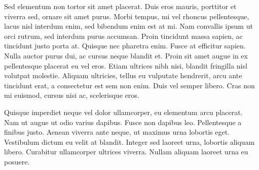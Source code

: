 Sed elementum non tortor sit amet placerat. Duis eros mauris, porttitor et viverra sed, ornare sit amet purus. Morbi tempus, mi vel rhoncus pellentesque, lacus nisl interdum enim, sed bibendum enim est at mi. Nam convallis ipsum ut orci rutrum, sed interdum purus accumsan. Proin tincidunt massa sapien, ac tincidunt justo porta at. Quisque nec pharetra enim. Fusce at efficitur sapien. Nulla auctor purus dui, ac cursus neque blandit et. Proin sit amet augue in ex pellentesque placerat eu vel eros. Etiam ultrices nibh nisi, blandit fringilla nisl volutpat molestie. Aliquam ultricies, tellus eu vulputate hendrerit, arcu ante tincidunt erat, a consectetur est sem non enim. Duis vel semper libero. Cras non mi euismod, cursus nisi ac, scelerisque eros.

Quisque imperdiet neque vel dolor ullamcorper, eu elementum arcu placerat. Nam ut augue ut odio varius dapibus. Fusce non dapibus leo. Pellentesque a finibus justo. Aenean viverra ante neque, ut maximus urna lobortis eget. Vestibulum dictum eu velit at blandit. Integer sed laoreet urna, lobortis aliquam libero. Curabitur ullamcorper ultrices viverra. Nullam aliquam laoreet urna eu posuere.
